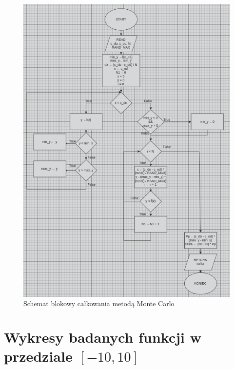 \documentclass{article}
\begin{document}
\begin{figure}[H]
  \centering
  \includegraphics[width=\textwidth]{"../assets/mc.png"}
  \caption{Schemat blokowy całkowania metodą Monte Carlo}
  \label{fig:block_diagram_monte_carlo}
\end{figure}


\section*{Wykresy badanych funkcji w przedziale $[-10, 10]$}
\end{document}
